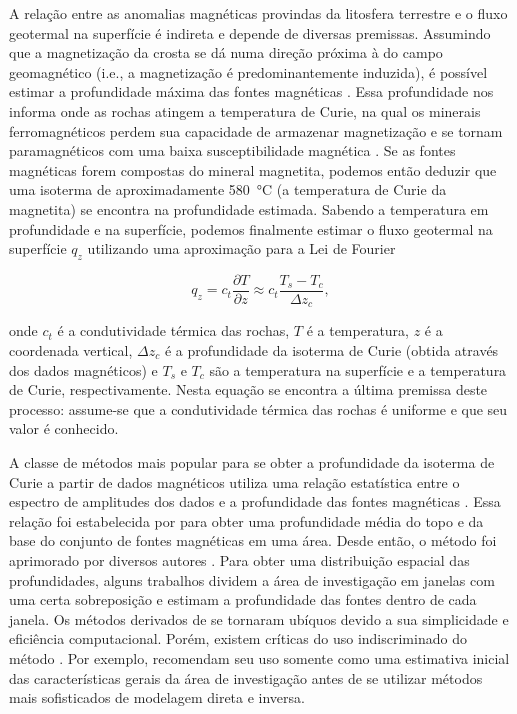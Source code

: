 \documentclass[12pt,a4paper,oneside]{book}
\begin{document}
A relação entre as anomalias magnéticas provindas da litosfera terrestre e o
fluxo geotermal na superfície é indireta e depende de diversas premissas.
Assumindo que a magnetização da crosta se dá numa direção próxima à do campo
geomagnético (i.e., a magnetização é predominantemente induzida), é possível
estimar a profundidade máxima das fontes magnéticas \citep{Spector1970}.
Essa profundidade nos informa onde as rochas atingem a temperatura de Curie,
na qual os minerais ferromagnéticos perdem sua capacidade de armazenar
magnetização e se tornam paramagnéticos com uma baixa susceptibilidade
magnética \citep{Blakely1988}.
Se as fontes magnéticas forem compostas do mineral magnetita, podemos então
deduzir que uma isoterma de aproximadamente \qty{580}{\degreeCelsius} (a
temperatura de Curie da magnetita) se encontra na profundidade estimada.
Sabendo a temperatura em profundidade e na superfície, podemos finalmente
estimar o fluxo geotermal na superfície $q_z$ utilizando uma aproximação para a
Lei de Fourier

\begin{equation}
  q_z = c_t \dfrac{\partial T}{\partial z} \approx c_t \dfrac{T_s - T_c}{\Delta z_c},
\end{equation}

\noindent
onde $c_t$ é a condutividade térmica das rochas, $T$ é a temperatura, $z$ é a
coordenada vertical, $\Delta z_c$ é a profundidade da isoterma de Curie (obtida
através dos dados magnéticos) e $T_s$ e $T_c$ são a temperatura na superfície e
a temperatura de Curie, respectivamente.
Nesta equação se encontra a última premissa deste processo: assume-se que a
condutividade térmica das rochas é uniforme e que seu valor é conhecido.

A classe de métodos mais popular para se obter a profundidade da isoterma de
Curie a partir de dados magnéticos utiliza uma relação estatística entre o
espectro de amplitudes dos dados e a profundidade das fontes magnéticas
\citep{BurtonJohnson2020}.
Essa relação foi estabelecida por \citet{Spector1970} para obter uma
profundidade média do topo e da base do conjunto de fontes magnéticas em uma
área.
Desde então, o método foi aprimorado por diversos autores \citep[uma revisão
dos métodos e suas limitações pode ser encontrada em ][]{NunezDemarco2020}.
Para obter uma distribuição espacial das profundidades, alguns trabalhos
dividem a área de investigação em janelas com uma certa sobreposição e estimam
a profundidade das fontes dentro de cada janela.
Os métodos derivados de \citet{Spector1970} se tornaram ubíquos devido a sua
simplicidade e eficiência computacional.
Porém, existem críticas do uso indiscriminado do método
\citep{Johnson2016,NunezDemarco2020}.
Por exemplo, \citet{Johnson2016} recomendam seu uso somente como uma estimativa
inicial das características gerais da área de investigação antes de se utilizar
métodos mais sofisticados de modelagem direta e inversa.
\end{document}
